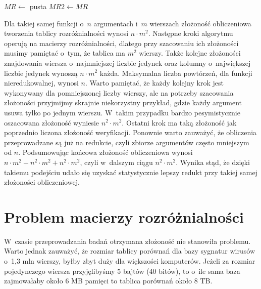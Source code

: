 \begin{algorithm}[H]
    $MR\gets$ pusta\;
    $MR2\gets MR$\;
\end{algorithm}

Dla takiej samej funkcji o~$n$ argumentach i~$m$ wierszach złożoność obliczeniowa tworzenia tablicy rozróżnialności wynosi $n \cdot m^2$.
Następne kroki algorytmu operują na macierzy rozróżnialności,
dlatego przy szacowaniu ich złożoności musimy pamiętać o~tym,
że tablica ma $m^2$ wierszy.
Także kolejne złożoności znajdowania wiersza o~najmniejszej liczbie jedynek oraz kolumny o~największej liczbie jedynek wynoszą $n \cdot m^2$ każda.
Maksymalna liczba powtórzeń,
dla funkcji nieredukowalnej,
wynosi $n$.
Warto pamiętać,
że każdy kolejny krok jest wykonywany dla pomniejszonej liczby wierszy,
ale na potrzeby szacowania złożoności przyjmijmy skrajnie niekorzystny przykład,
gdzie każdy argument usuwa tylko po jednym wierszu.
W~takim przypadku bardzo pesymistycznie oszacowana złożoność wyniesie $n^2 \cdot m^2$.
Ostatni krok ma taką złożoność jak poprzednio liczona złożoność weryfikacji.
Ponownie warto zauważyć,
że obliczenia przeprowadzane są już na redukcie,
czyli zbiorze argumentów często mniejszym od $n$.
Podsumowując końcowa złożoność obliczeniowa wynosi $n \cdot m^2 + n^2 \cdot m^2 + n^2 \cdot m^2$,
czyli w~dalszym ciągu $n^2 \cdot m^2$.
Wynika stąd,
że dzięki takiemu podejściu udało się uzyskać statystycznie lepszy redukt przy takiej samej złożoności obliczeniowej.


\section{Problem macierzy rozróżnialności}

W~czasie przeprowadzania badań otrzymana złożoność nie stanowiła problemu.
Warto jednak zauważyć,
że rozmiar tablicy porównań dla bazy sygnatur wirusów o~1,3 mln wierszy,
byłby zbyt duży dla większości komputerów.
Jeżeli za rozmiar pojedynczego wiersza przyjęlibyśmy 5 bajtów (40 bitów), to o~ile sama baza zajmowałaby około 6 MB pamięci to tablica porównań około 8 TB.

